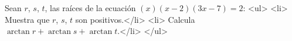 Sean $r$, $s$, $t$, las raíces de la ecuación $(x)(x-2)(3x-7)=2$:
<ul>
<li> Muestra que $r$, $s$, $t$ son positivos.</li>
<li> Calcula $\arctan r+\arctan s+\arctan t$.</li>
</ul>